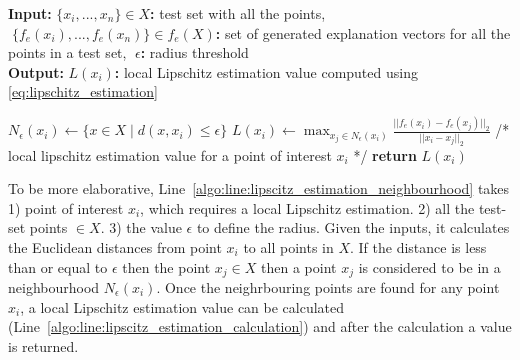 \documentclass[english]{tktltiki2}
\theoremstyle{definition}
\theoremstyle{remark}
\newcommand{\multicommentsymbolstart}{/*}
\newcommand{\multicommentsymbolend}{*/}
\newcommand{\MultiLineComment}[2][\algorithmicindent]{\Statex \hspace{#1}\multicommentsymbolstart{} #2 \multicommentsymbolend{}}
\newcommand{\onespace}{\;}
\begin{document}
\begin{algorithm}[H]
	\caption{$LipschitzEstimations(X,\onespace f_e(X),\onespace \epsilon)$}
	\label{algo:lipscitz_estimation}
	\hspace*{\algorithmicindent} \textbf{Input}\textbf{:} $\{x_i,...,x_n\} \in X$\textbf{:} test set with all the points, $\onespace \{f_e(x_i),...,f_e(x_n)\} \in f_e(X)$\textbf{:} set of generated explanation vectors for all the points in a test set, $\onespace \epsilon$\textbf{:} radius threshold \\
	\hspace*{\algorithmicindent} \textbf{Output}\textbf{:} $L(x_i)$\textbf{:} local Lipschitz estimation value computed using \eqref{eq:lipschitz_estimation}
	\begin{algorithmic}[1]
		\State \label{algo:line:lipscitz_estimation_neighbourhood} $N_\epsilon(x_i)\leftarrow \{x\in X\mid d(x,x_i)\le \epsilon\}$ \Comment {\eqref{eq:neighbourhood}}
		\State \label{algo:line:lipscitz_estimation_calculation} $L(x_i) \gets \operatorname*{max}_{x_j \in N_\epsilon(x_i)} \frac{||f_e(x_i) - f_e(x_j)||_2}{||x_i - x_j||_2}$ \Comment {\eqref{eq:lipschitz_estimation}}
		\EndFor
		\MultiLineComment[0\dimexpr\algorithmicindent]{local lipschitz estimation value for a point of interest $x_i$}
		\State \textbf{return} $L(x_i)$
	\end{algorithmic}
\end{algorithm}

To be more elaborative, Line~\ref{algo:line:lipscitz_estimation_neighbourhood}
takes 1)  point of interest $x_i$, which requires a local Lipschitz estimation. 2) all the test-set points $ \in X$. 3) the value $\epsilon$ to define the radius. Given the inputs, it calculates the Euclidean distances from point $x_i$ to all points in $X$. If the distance is less than or equal to $\epsilon$ then the point $x_j \in X$ then a point $x_j$ is considered to be in a neighbourhood $N_{\epsilon}(x_i)$. Once the neighrbouring points are found for any point $x_i$, a local Lipschitz estimation value can be calculated (Line~\ref{algo:line:lipscitz_estimation_calculation}) and after the calculation a value is returned.
\end{document}
